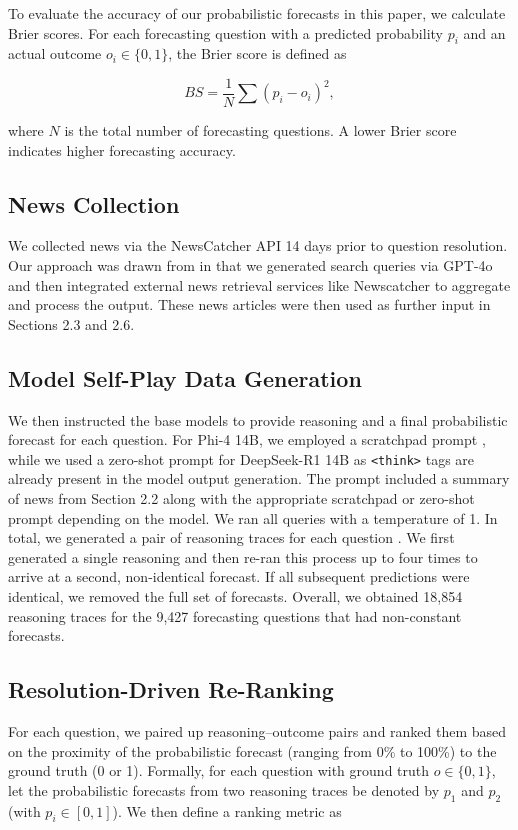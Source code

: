 \documentclass{article}
\begin{document}
To evaluate the accuracy of our probabilistic forecasts in this paper, we calculate Brier scores. For each forecasting question with a predicted probability $p_i$ and an actual outcome $o_i \in \{0,1\}$, the Brier score is defined as

\[
BS = \frac{1}{N}\sum (p_i - o_i)^2,
\]

where $N$ is the total number of forecasting questions. A lower Brier score indicates higher forecasting accuracy.

\subsection{News Collection}
We collected news via the NewsCatcher API 14 days prior to question resolution. Our approach was drawn from \cite{Halawi2024} in that we generated search queries via GPT-4o and then integrated external news retrieval services like Newscatcher to aggregate and process the output. These news articles were then used as further input in Sections 2.3 and 2.6.

\subsection{Model Self-Play Data Generation}
We then instructed the base models to provide reasoning and a final probabilistic forecast for each question. For Phi-4 14B, we employed a scratchpad prompt \citep{Nye2021}, while we used a zero-shot prompt for DeepSeek-R1 14B as \texttt{<think>} tags are already present in the model output generation. The prompt included a summary of news from Section 2.2 along with the appropriate scratchpad or zero-shot prompt depending on the model. We ran all queries with a temperature of 1. In total, we generated a pair of reasoning traces for each question \citep{Munos2023}. We first generated a single reasoning and then re-ran this process up to four times to arrive at a second, non-identical forecast. If all subsequent predictions were identical, we removed the full set of forecasts. Overall, we obtained 18,854 reasoning traces for the 9,427 forecasting questions that had non-constant forecasts.

\subsection{Resolution-Driven Re-Ranking}
For each question, we paired up reasoning–outcome pairs and ranked them based on the proximity of the probabilistic forecast (ranging from 0\% to 100\%) to the ground truth (0 or 1). Formally, for each question with ground truth $o \in \{0,1\}$, let the probabilistic forecasts from two reasoning traces be denoted by $p_1$ and $p_2$ (with $p_i \in [0,1]$). We then define a ranking metric as
\end{document}

